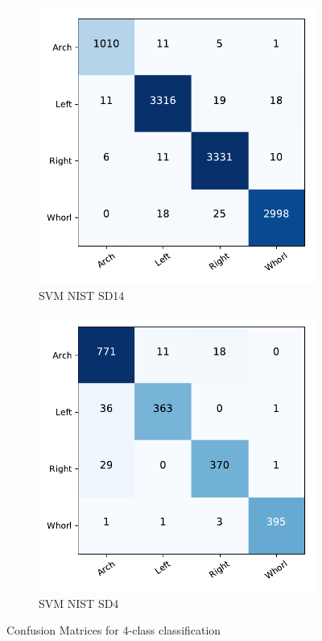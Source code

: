 \begin{figure}[!ht]
	\begin{subfigure}[b]{0.25\textwidth}
		\centering
		\includegraphics[width=\linewidth]{fig/figs/confusion_matrix_svm_sd14_4class.pdf}
		\caption{SVM NIST SD14 }
		\label{fig.cnf_matrix_4class.svm_sd14}
	\end{subfigure}%
	\begin{subfigure}[b]{0.25\textwidth}
		\centering
		\includegraphics[width=\linewidth]{fig/figs/confusion_matrix_svm_sd4_4class.pdf}
		\caption{SVM NIST SD4}
		\label{fig.cnf_matrix_4class.svm_sd4}
	\end{subfigure}%

	\caption{Confusion Matrices for 4-class classification}\label{fig.cnf_matrix_4class}
\end{figure}

